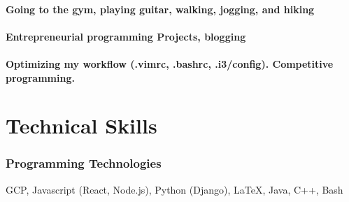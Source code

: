 \documentclass{article}
\begin{document}
\paragraph{Going to the gym, playing guitar, walking, jogging, and hiking}

\paragraph{Entrepreneurial programming Projects, blogging}

\paragraph{Optimizing my workflow (.vimrc, .bashrc, .i3/config). Competitive
  programming.}


\section{Technical Skills}

\subsubsection{Programming Technologies}
\hfill GCP, Javascript (React, Node.js), Python (Django), \LaTeX, Java, C++, Bash

\end{document}
